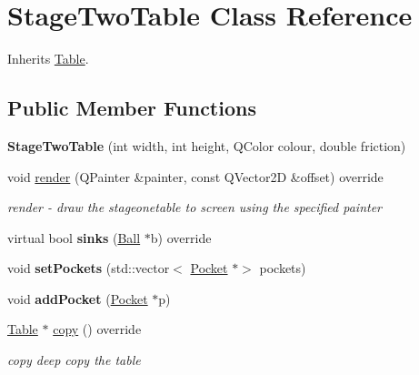 \hypertarget{class_stage_two_table}{}\section{Stage\+Two\+Table Class Reference}
\label{class_stage_two_table}


Inherits \mbox{\hyperlink{class_table}{Table}}.

\subsection*{Public Member Functions}
\begin{DoxyCompactItemize}
\item 
\mbox{\label{class_stage_two_table_abfe56f335f3eda0c72ae8477fe65e71f}} 
{\bfseries Stage\+Two\+Table} (int width, int height, Q\+Color colour, double friction)
\item 
void \mbox{\hyperlink{class_stage_two_table_ad19f7aa333b65d84b67ce2e55330a669}{render}} (Q\+Painter \&painter, const Q\+Vector2D \&offset) override
\begin{DoxyCompactList}\small\item\em render -\/ draw the stageonetable to screen using the specified painter \end{DoxyCompactList}\item 
\mbox{\label{class_stage_two_table_a3e015671be449da741adaf86e00ec844}} 
virtual bool {\bfseries sinks} (\mbox{\hyperlink{class_ball}{Ball}} $\ast$b) override
\item 
\mbox{\label{class_stage_two_table_a0ee81cb52ee0caba2a68449409a63d10}} 
void {\bfseries set\+Pockets} (std\+::vector$<$ \mbox{\hyperlink{class_pocket}{Pocket}} $\ast$$>$ pockets)
\item 
\mbox{\label{class_stage_two_table_a13e9626ecbb5f84766efe7342e122873}} 
void {\bfseries add\+Pocket} (\mbox{\hyperlink{class_pocket}{Pocket}} $\ast$p)
\item 
\mbox{\hyperlink{class_table}{Table}} $\ast$ \mbox{\hyperlink{class_stage_two_table_ab87e388ca2927670b37dffccb91a76b4}{copy}} () override
\begin{DoxyCompactList}\small\item\em copy deep copy the table \end{DoxyCompactList}\end{DoxyCompactItemize}
